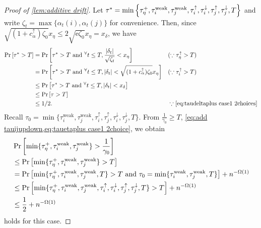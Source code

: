 \documentclass[letterpaper,11pt]{article}
\DeclarePairedDelimiter{\cbra}{\lbrace}{\rbrace} %
\newcommand{\e}{\mathrm{e}}
\newcommand{\alphanorm}{\gamma}
\newcommand{\taudeltaplus}{\tau^{+}_\delta}
\newcommand{\tauetaplus}{\tau^{+}_\eta}
\newcommand{\calphaup}{c^{\uparrow}_\alpha}
\newcommand{\taudeltadown}{\tau^{\downarrow}_\delta}
\newcommand{\tauiup}{\tau^{\uparrow}_i}
\newcommand{\tauidown}{\tau^{\downarrow}_i}
\newcommand{\tauiweak}{\tau^{\mathrm{weak}}_i}
\newcommand{\taujweak}{\tau^{\mathrm{weak}}_j}
\newcommand{\taujup}{\tau^{\uparrow}_j}
\newcommand{\taujdown}{\tau^{\downarrow}_j}
\newcommand{\tinyforall}{{}^{\forall}}
\newcommand{\tauetaup}{\tau^{\uparrow}_\eta}
\newcommand{\cetaup}{c^\uparrow_\eta}
\newcommand{\xdelta}{x_{\delta}}
\newcommand{\xeta}{x_{\eta}}
\newcommand{\taustar}{\tau^*}
\begin{document}
\begin{proof}[Proof of \cref{lem:additive drift}]
    Let $\tau^*=\min\qty{\tauetaplus,\tauiweak,\taujweak,\tauiup,\tauidown,\taujup,\taujdown,T}$ and write $\zeta_t=\max\{\alpha_t(i),\alpha_t(j)\}$ for convenience.
    Then, since $\sqrt{(1+\calphaup)\zeta_0}\xeta \leq 2\sqrt{\e \zeta_0}\xeta =\xdelta$,
    we have
      \begin{align}
          \Pr\qty[\tau^*>T]
          &=\Pr\qty[\tau^*>T\textrm{ and }
          \tinyforall t\leq T, \frac{\abs{\delta_t}}{\sqrt{\zeta_t}}< \xeta ]&&(\because \tauetaup>T) \nonumber\\
          &=\Pr\qty[\tau^*>T\textrm{ and }
          \tinyforall t\leq T, \abs{\delta_t}< \sqrt{(1+\calphaup)\zeta_0}\xeta] &&(\because \tauiup>T) \nonumber\\
          &\leq \Pr\qty[\tau^*>T\textrm{ and }\tinyforall t\leq T, \abs{\delta_t}<\xdelta] \nonumber\\
          &\leq \Pr\qty[\tau>T] \nonumber\\
          &\le 1/2. & & \because \text{\cref{eq:taudeltaplus case1 2choices}} \label{eq:tauetaplus case1 2choice}
      \end{align}
    Recall $\tau_0=\min\{\tauiweak,\taujweak,\tauiup,\taujup,\tauidown,\taujdown,T\}$.
    From $\frac{1}{\alphanorm_0}\geq T$, \cref{eq:add tauijupdown,eq:tauetaplus case1 2choice}, we obtain 
    \begin{align*}
      &\Pr\qty[\min\{\tauetaplus,\tauiweak,\taujweak\}>\frac{1}{\alphanorm_0}]\\
      &\leq \Pr\qty[\min\{\tauetaplus,\tauiweak,\taujweak\}>T]\\
      &=\Pr\qty[\min\{\tauetaplus,\tauiweak,\taujweak,T\}>T\textrm{ and }\tau_0=\min\{\tauiweak,\taujweak,T\}]+n^{-\Omega(1)}\\
      &\leq \Pr\qty[\min\{\tauetaplus,\tauiweak,\taujweak,\tauiup,\tauidown,\taujup,\taujdown,T\}>T]+n^{-\Omega(1)}\\
      &\leq \frac{1}{2}+n^{-\Omega(1)}
    \end{align*}
    holds for this case.
  

\end{proof}
\end{document}
